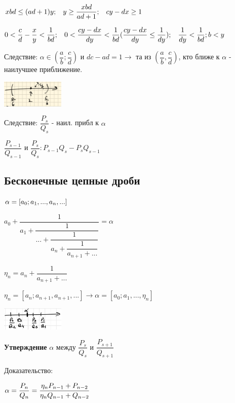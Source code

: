 \documentclass[12pt]{article}
\begin{document}
$xbd \leq (ad+1)y ; \hspace{2 ex} y \geq \dfrac{xbd}{ad+1} ;\hspace{2 ex} cy - dx \geq 1$

$0 < \dfrac{c}{d} - \dfrac{x}{y} < \dfrac{1}{bd} ;\hspace{2 ex} 0< \dfrac{cy - dx}{dy} < \dfrac{1}{bd} (\dfrac{cy - dx}{dy} \leq \dfrac{1}{dy}); \hspace{2 ex} \dfrac{1}{dy} < \dfrac{1}{bd} ; b<y$

Следствие: $\alpha \in (\dfrac{a}{b};\dfrac{c}{d})$ и $dc - ad = 1 \rightarrow$ та из $(\dfrac{a}{b}, \dfrac{c}{d})$, кто ближе к $\alpha$ - наилучшее приближение.

\includegraphics[width=30mm]{image3.png}

Следствие: $\dfrac{P_s}{Q_s} $ - наил. прибл к $\alpha$

$\dfrac{P_{s-1}}{Q_{s-1}}$ и $\dfrac{P_s}{Q_s} : P_{s-1} Q_s - P_s Q_{s-1}$


\subsection{Бесконечные цепные дроби}
$\alpha = [a_0;a_1,...,a_n,...] \vspace{1 ex}$

$ a_0 + \dfrac{1}{a_1 + \dfrac{1}{... + \dfrac{1}{a_n + \dfrac{1}{a_{n+1} + ...}}}} = \alpha$

$\eta_n = a_n + \dfrac{1}{a_{n + 1} + ...}$

$\eta_n = [a_n;a_{n+1}, a_{n+1}, ...] \rightarrow \alpha = [a_0;a_1,...,\eta_n]$

\includegraphics[width=30mm]{image.png}

\textbf{Утверждение} $\alpha$ между $\dfrac{P_s}{Q_s}$ и $\dfrac{P_{s+1}}{Q_{s+1}} $

Доказательство:

$\alpha = \dfrac{P_n}{Q_n} = \dfrac{\eta_n P_{n-1} + P_{n-2}}{\eta_n Q_{n-1} + Q_{n-2}} \vspace{2 ex}$
\end{document}
